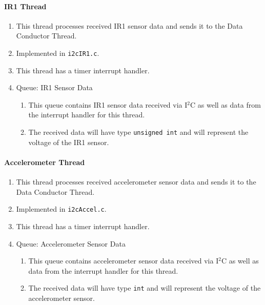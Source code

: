 \paragraph*{IR1 Thread}
\begin{enumerate}
	\item This thread processes received IR1 sensor data and sends it to the Data Conductor Thread.
	\item Implemented in \texttt{i2cIR1.c}.
	\item This thread has a timer interrupt handler.
	\item Queue: IR1 Sensor Data
	\begin{enumerate}
		\item This queue contains IR1 sensor data received via I$^2$C as well as data from the interrupt handler for this thread.
		\item The received data will have type \texttt{unsigned int} and will represent the voltage of the IR1 sensor.
	\end{enumerate}
\end{enumerate}

\paragraph*{Accelerometer Thread}
\begin{enumerate}
	\item This thread processes received accelerometer sensor data and sends it to the Data Conductor Thread.
	\item Implemented in \texttt{i2cAccel.c}.
	\item This thread has a timer interrupt handler.
	\item Queue: Accelerometer Sensor Data
	\begin{enumerate}
		\item This queue contains accelerometer sensor data received via I$^2$C as well as data from the interrupt handler for this thread.
		\item The received data will have type \texttt{int} and will represent the voltage of the accelerometer sensor.
	\end{enumerate}
\end{enumerate}

